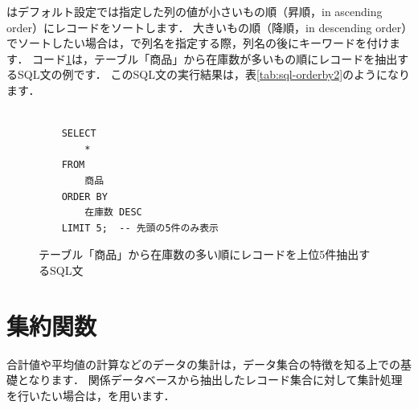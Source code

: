 はデフォルト設定では指定した列の値が小さいもの順（昇順，in ascending order）にレコードをソートします．
大きいもの順（降順，in descending order）でソートしたい場合は，で列名を指定する際，列名の後にキーワードを付けます．
コード\ref{code:sql-orderby2}は，テーブル「商品」から在庫数が多いもの順にレコードを抽出するSQL文の例です．
このSQL文の実行結果は，表\ref{tab:sql-orderby2}のようになります．
\begin{figure}[!htbp]
    \begin{verbatim}

    SELECT
        *
    FROM
        商品
    ORDER BY
        在庫数 DESC
    LIMIT 5;  -- 先頭の5件のみ表示

    \end{verbatim}
    \captionsetup{name=コード}
    \caption{テーブル「商品」から在庫数の多い順にレコードを上位5件抽出するSQL文}
    \label{code:sql-orderby2}
\end{figure}
\begin{table}[!htbp]
    \centering
    \caption{テーブル「商品」から在庫数の多い順にレコードを抽出した結果（上位5件）}
    \label{tab:sql-orderby2}
\end{table}


\section{集約関数}
合計値や平均値の計算などのデータの集計は，データ集合の特徴を知る上での基礎となります．
関係データベースから抽出したレコード集合に対して集計処理を行いたい場合は，を用います．

